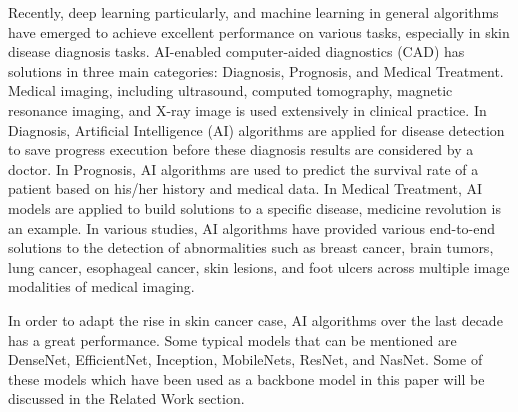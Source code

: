 \documentclass[sensors,article,submit,pdftex,moreauthors]{Definitions/mdpi}
\begin{document}
Recently, deep learning particularly, and machine learning in general algorithms have emerged to achieve excellent performance on various tasks, especially in skin disease diagnosis tasks. AI-enabled computer-aided diagnostics (CAD) has solutions in three main categories: Diagnosis, Prognosis, and Medical Treatment. Medical imaging, including ultrasound, computed tomography, magnetic resonance imaging, and X-ray image is used extensively in clinical practice. In Diagnosis, Artificial Intelligence (AI) algorithms are applied for disease detection to save progress execution before these diagnosis results are considered by a doctor. In Prognosis, AI algorithms are used to predict the survival rate of a patient based on his/her history and medical data. In Medical Treatment, AI models are applied to build solutions to a specific disease, medicine revolution is an example. In various studies, AI algorithms have provided various end-to-end solutions to the detection of abnormalities such as breast cancer, brain tumors, lung cancer, esophageal cancer, skin lesions, and foot ulcers across multiple image modalities of medical imaging\cite{11872}.

In order to adapt the rise in skin cancer case, AI algorithms over the last decade has a great performance. Some typical models that can be mentioned are DenseNet\cite{06993}, EfficientNet\cite{04861}, Inception\cite{00567}, MobileNets\cite{04861}\cite{04381}\cite{02244}, ResNet\cite{03385}\cite{05027}, and NasNet\cite{07012}. Some of these models which have been used as a backbone model in this paper will be discussed in the Related Work section.
\end{document}
